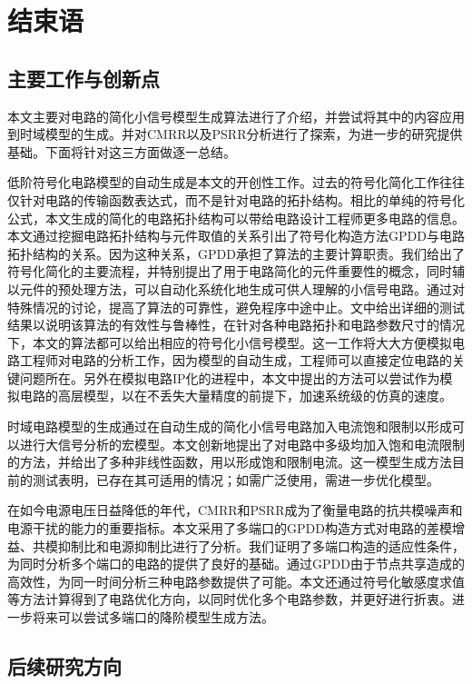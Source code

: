 \chapter{结束语}
\label{chap:con}

\section{主要工作与创新点}
\label{sec:con:job}

本文主要对电路的简化小信号模型生成算法进行了介绍，并尝试将其中的内容应用到时域模型的生成。并对CMRR以及PSRR分析进行了探索，为进一步的研究提供基础。下面将针对这三方面做逐一总结。

低阶符号化电路模型的自动生成是本文的开创性工作。过去的符号化简化工作往往仅针对电路的传输函数表达式，而不是针对电路的拓扑结构。相比的单纯的符号化公式，本文生成的简化的电路拓扑结构可以带给电路设计工程师更多电路的信息。本文通过挖掘电路拓扑结构与元件取值的关系引出了符号化构造方法GPDD与电路拓扑结构的关系。因为这种关系，GPDD承担了算法的主要计算职责。我们给出了符号化简化的主要流程，并特别提出了用于电路简化的元件重要性的概念，同时辅以元件的预处理方法，可以自动化系统化地生成可供人理解的小信号电路。通过对特殊情况的讨论，提高了算法的可靠性，避免程序中途中止。文中给出详细的测试结果以说明该算法的有效性与鲁棒性，在针对各种电路拓扑和电路参数尺寸的情况下，本文的算法都可以给出相应的符号化小信号模型。这一工作将大大方便模拟电路工程师对电路的分析工作，因为模型的自动生成，工程师可以直接定位电路的关键问题所在。另外在模拟电路IP化的进程中，本文中提出的方法可以尝试作为模拟电路的高层模型，以在不丢失大量精度的前提下，加速系统级的仿真的速度。

时域电路模型的生成通过在自动生成的简化小信号电路加入电流饱和限制以形成可以进行大信号分析的宏模型。本文创新地提出了对电路中多级均加入饱和电流限制的方法，并给出了多种非线性函数，用以形成饱和限制电流。这一模型生成方法目前的测试表明，已存在其可适用的情况；如需广泛使用，需进一步优化模型。

在如今电源电压日益降低的年代，CMRR和PSRR成为了衡量电路的抗共模噪声和电源干扰的能力的重要指标。本文采用了多端口的GPDD构造方式对电路的差模增益、共模抑制比和电源抑制比进行了分析。我们证明了多端口构造的适应性条件，为同时分析多个端口的电路的提供了良好的基础。通过GPDD由于节点共享造成的高效性，为同一时间分析三种电路参数提供了可能。本文还通过符号化敏感度求值等方法计算得到了电路优化方向，以同时优化多个电路参数，并更好进行折衷。进一步将来可以尝试多端口的降阶模型生成方法。

\section{后续研究方向}
\label{sec:con:future}

